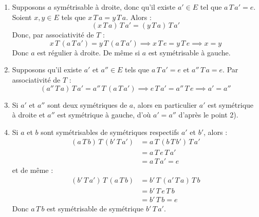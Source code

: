 \documentclass[a4paper,11pt]{article}
\begin{document}
\begin{demonstration}
\begin{enumerate}
    \item Supposons $a$ symétrisable à droite, donc qu'il existe $a' \in E$ tel que $a \, T \, a' = e$.
    Soient $x, y \in E$ tels que $x \, T \, a = y \, T \, a$. Alors :
    \[
    (x \, T \, a) \, T \, a' = (y \, T \, a) \, T \, a'
    \]
    Donc, par associativité de $T$ :
    \[
    x \, T \, (a \, T \, a') = y \, T \, (a \, T \, a') \implies x \, T \, e = y \, T \, e \implies x = y
    \]
    Donc $a$ est régulier à droite. De même si $a$ est symétrisable à gauche.

    \item Supposons qu'il existe $a'$ et $a'' \in E$ tels que $a \, T \, a' = e$ et $a'' \, T \, a = e$. Par associativité de $T$ :
    \[
    (a'' \, T \, a) \, T \, a' = a'' \, T \, (a \, T \, a') \implies e \, T \, a' = a'' \, T \, e \implies a' = a''
    \]

    \item Si $a'$ et $a''$ sont deux symétriques de $a$, alors en particulier $a'$ est symétrique à droite et $a''$ est symétrique à gauche, d'où $a' = a''$ d'après le point 2).

    \item Si $a$ et $b$ sont symétrisables de symétriques respectifs $a'$ et $b'$, alors :
    \begin{align*}
        (a \, T \, b) \, T \, (b' \, T \, a') &= a \, T \, (b \, T \, b') \, T \, a' \\
                                              &= a \, T \, e \, T \, a' \\
                                              &= a \, T \, a' = e
    \end{align*}
    et de même :
    \begin{align*}
        (b' \, T \, a') \, T \, (a \, T \, b) &= b' \, T \, (a' \, T \, a) \, T \, b \\
                                              &= b' \, T \, e \, T \, b \\
                                              &= b' \, T \, b = e
    \end{align*}
    Donc $a \, T \, b$ est symétrisable de symétrique $b' \, T \, a'$.
\end{enumerate}
\end{demonstration}
\end{document}

